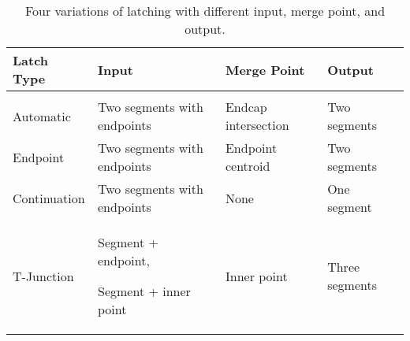 
\begin{table}%
\centering
\begin{tabular}{p{2.5cm}| p{5.4cm} | p{3.5cm} | p{3cm}}
\textbf{Latch Type} & \textbf{Input} & \textbf{Merge Point} & \textbf{Output} \\
\hline
& & & \\

Automatic &

Two segments with endpoints & 

Endcap intersection &

Two segments

\\ 

Endpoint &

Two segments with endpoints & 

Endpoint centroid &

Two segments

\\ 

Continuation &

Two segments with endpoints & 

None &

One segment

\\ 

T-Junction &

Segment + endpoint, \par Segment + inner point & 

Inner point &

Three segments

\\ 

\end{tabular}
\caption[Summary of latching]{Four variations of latching with
  different input, merge point, and output.}
\label{tab:latch}
\end{table}
